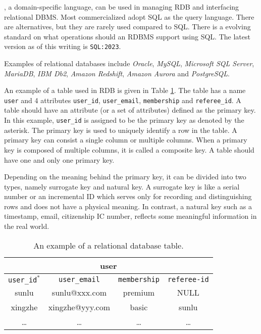 , a domain-specific language, can be used in managing RDB and interfacing relational DBMS.  Most commercialized  adopt SQL as the query language. There are alternatives, but they are rarely used compared to SQL. There is a evolving standard on what operations should an RDBMS support using SQL. The latest version as of this writing is \verb|SQL:2023|.

Examples of relational databases include \textit{Oracle}, \textit{MySQL}, \textit{Microsoft SQL Server}, \textit{MariaDB}, \textit{IBM Db2}, \textit{Amazon Redshift}, \textit{Amazon Aurora} and \textit{PostgreSQL}.

An example of a table used in RDB is given in Table \ref{ch:db:tab:relationaldbexample}. The table has a name \verb|user| and 4 attributes \verb|user_id|, \verb|user_email|, \verb|membership| and \verb|referee_id|. A table should have an attribute (or a set of attributes) defined as the primary key. In this example, \verb|user_id| is assigned to be the primary key as denoted by the asterisk. The primary key is used to uniquely identify a row in the table. A primary key can consist a single column or multiple columns. When a primary key is composed of multiple columns, it is called a composite key. A table should have one and only one primary key.

Depending on the meaning behind the primary key, it can be divided into two types, namely surrogate key and natural key. A surrogate key is like a serial number or an incremental ID which serves only for recording and distinguishing rows and does not have a physical meaning. In contrast, a natural key such as a timestamp, email, citizenship IC number, reflects some meaningful information in the real world.

\begin{table}
	\centering \caption{An example of a relational database table.} \label{ch:db:tab:relationaldbexample}
	\begin{tabular}{|c|c|c|c|}
		\hline
		\multicolumn{4}{|c|}{user} \\ \hline
		\verb|user_id|$^*$ & \verb|user_email| & \verb|membership| & \verb|referee-id| \\ \hline
		sunlu & sunlu@xxx.com & premium & NULL \\ \hline
		xingzhe & xingzhe@yyy.com & basic & sunlu \\ \hline
		\ldots & \ldots & \ldots & \ldots \\ \hline
	\end{tabular}
\end{table}


